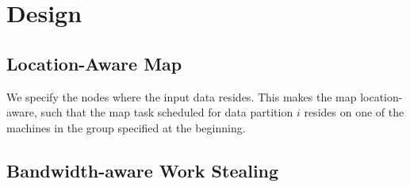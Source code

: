 \section{Design}

\subsection{Location-Aware Map}

We specify the nodes where the input data resides. This makes the map location-aware, such that the map task scheduled for data partition $i$ resides on one of the machines in the group specified at the beginning.


\subsection{Bandwidth-aware Work Stealing}
